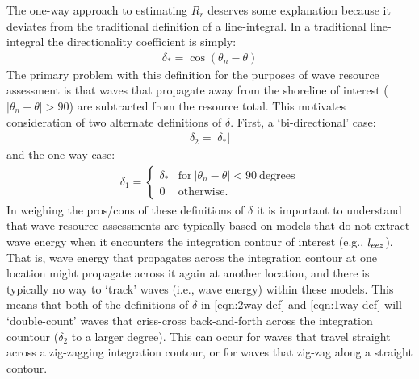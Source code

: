 The one-way approach to estimating $R_r$ deserves some explanation because it deviates from the traditional definition of a line-integral. In a traditional line-integral the directionality coefficient is simply:
\begin{align}
    \delta_{*} = \cos(\theta_n - \theta)
    \label{eqn:trad-def}
\end{align}
The primary problem with this definition for the purposes of wave resource assessment is that waves that propagate away from the shoreline of interest ($|\theta_n - \theta|>90$) are subtracted from the resource total. This motivates consideration of two alternate definitions of $\delta$. First, a `bi-directional' case:
\begin{align}
    \delta_2 = |\delta_{*}|
    \label{eqn:2way-def}
\end{align}
and the one-way case:
\begin{align}
    \delta_1 = 
    \begin{cases}
     \delta_* & \mathrm{for\ }|\theta_n - \theta|<90\ \mathrm{degrees} \\
    0 & \mathrm{otherwise}.       
    \end{cases}
    \label{eqn:1way-def}
\end{align}
In weighing the pros/cons of these definitions of $\delta$ it is important to understand that wave resource assessments are typically based on models that do not extract wave energy when it encounters the integration contour of interest (e.g., $l_{eez}$). That is, wave energy that propagates across the integration contour at one location might propagate across it again at another location, and there is typically no way to `track' waves (i.e., wave energy) within these models.
This means that both of the definitions of $\delta$ in \eqref{eqn:2way-def} and \eqref{eqn:1way-def} will `double-count' waves that criss-cross back-and-forth across the integration countour ($\delta_2$ to a larger degree). This can occur for waves that travel straight across a zig-zagging integration contour, or for waves that zig-zag along a straight contour. 

